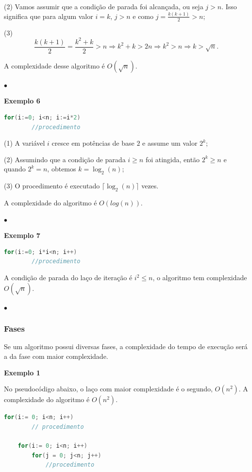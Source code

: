 (2) Vamos assumir que a condição de parada foi alcançada, ou seja $j>n$. Isso significa que para algum valor $i=k$, $j>n$ e como $j = \frac{k(k+1)}{2} > n$;

(3)
\[\frac{k(k+1)}{2} =  \frac{k^2+k}{2}> n \Rightarrow k^2+k > 2n \Rightarrow k^2 > n \Rightarrow k > \sqrt{n}. \]

A complexidade desse algoritmo é $O(\sqrt{n})$.

{\raggedleft $\bullet$ \par}

\textbf{Exemplo 6}

\begin{lstlisting}[language=C, frame=single]
    for(i:=0; i<n; i:=i*2)
        //procedimento
\end{lstlisting}

(1) A variável $i$ cresce em potências de base $2$ e assume um valor $2^k$;

(2) Assumindo que a condição de parada $i\geq n$ foi atingida, então $2^k \geq n$ e quando $2^k = n$, obtemos $k = \log_2(n)$;

(3) O procedimento é executado $\lceil \log_2(n) \rceil$ vezes.

A complexidade do algoritmo é $O(log(n))$.

{\raggedleft $\bullet$ \par}

\textbf{Exemplo 7}

\begin{lstlisting}[language=C, frame=single]
    for(i:=0; i*i<n; i++)
        //procedimento
\end{lstlisting}

A condição de parada do laço de iteração é $i^2  \leq n$, o algoritmo tem complexidade $O(\sqrt{n})$.

{\raggedleft $\bullet$ \par}

\subsubsection{Fases}

Se um algoritmo possui diversas fases, a complexidade do tempo de execução será a da fase com maior complexidade.

\textbf{Exemplo 1}

No pseudocódigo abaixo, o laço com maior complexidade é o segundo, $O(n^2)$. A complexidade do algoritmo é $O(n^2)$.

\begin{lstlisting}[language=C, frame=single]
    for(i:= 0; i<n; i++)
        // procedimento
    
    for(i:= 0; i<n; i++)
        for(j = 0; j<n; j++)
            //procedimento
\end{lstlisting}
    

